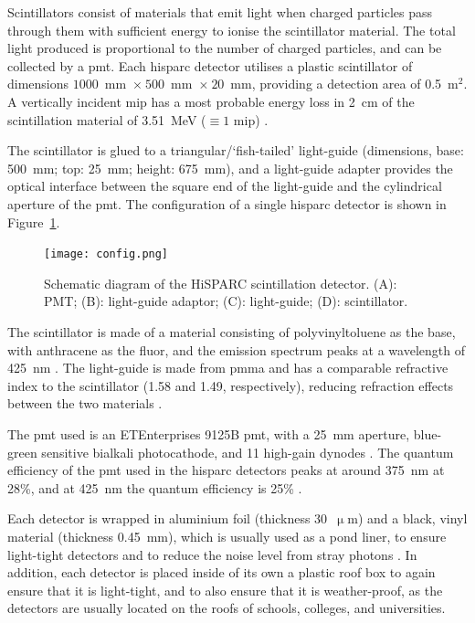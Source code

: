 Scintillators consist of materials that emit light when charged particles pass through them with sufficient energy to ionise the scintillator material. The total light produced is proportional to the number of charged particles, and can be collected by a \gls{pmt}. Each \gls{hisparc} detector utilises a plastic scintillator of dimensions $1000$~mm~$\times~500$~mm~$\times~20$~mm, providing a detection area of 0.5~$\mathrm{m}^2$. A vertically incident \gls{mip} has a most probable energy loss in 2~cm of the scintillation material of 3.51~MeV ($\equiv 1$ \gls{mip}) \citep{van_dam_hisparc_2020}.

The scintillator is glued to a triangular/`fish-tailed' light-guide (dimensions, base: 500~mm; top: 25~mm; height: 675~mm), and a light-guide adapter provides the optical interface between the square end of the light-guide and the cylindrical aperture of the \gls{pmt}. The configuration of a single \gls{hisparc} detector is shown in Figure~\ref{fig:HS_scintillator}. 

\begin{figure}[ht!]
	\centering
	\texttt{[image: config.png]}
	\caption{Schematic diagram of the HiSPARC scintillation detector. (A): PMT; (B): light-guide adaptor; (C): light-guide; (D): scintillator.}
	\label{fig:HS_scintillator}
\end{figure}

The scintillator is made of a material consisting of polyvinyltoluene as the base, with anthracene as the fluor, and the emission spectrum peaks at a wavelength of 425~nm \citep{fokkema_hisparc_2012, bartels_hisparc_2012}. The light-guide is made from \gls{pmma} and has a comparable refractive index to the scintillator (1.58 and 1.49, respectively), reducing refraction effects between the two materials \citep{van_dam_hisparc_2020}.

The \gls{pmt} used is an ETEnterprises 9125B \gls{pmt}, with a 25~mm aperture,  blue-green sensitive bialkali photocathode, and 11 high-gain dynodes \citep{bartels_hisparc_2012,et_enterprises_data_2020}. The quantum efficiency of the \gls{pmt} used in the \gls{hisparc} detectors peaks at around 375~nm at 28\%, and at 425~nm the quantum efficiency is 25\% \citep{fokkema_hisparc_2012}. 

Each detector is wrapped in aluminium foil (thickness 30~$\upmu$m) and a black, vinyl material (thickness 0.45~mm), which is usually used as a pond liner, to ensure light-tight detectors and to reduce the noise level from stray photons \citep{van_dam_hisparc_2020}. In addition, each detector is placed inside of its own a plastic roof box to again ensure that it is light-tight, and to also ensure that it is weather-proof, as the detectors are usually located on the roofs of schools, colleges, and universities.

